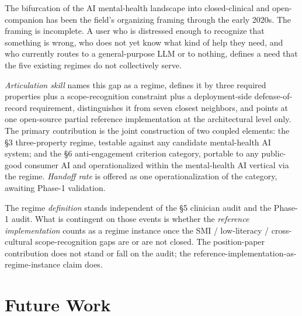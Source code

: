 \documentclass[letterpaper]{article}
\begin{document}
The bifurcation of the AI mental-health landscape into closed-clinical and open-companion has been the field's organizing framing through the early 2020s. The framing is incomplete. A user who is distressed enough to recognize that something is wrong, who does not yet know what kind of help they need, and who currently routes to a general-purpose LLM or to nothing, defines a need that the five existing regimes do not collectively serve.

\emph{Articulation skill} names this gap as a regime, defines it by three required properties plus a scope-recognition constraint plus a deployment-side defense-of-record requirement, distinguishes it from seven closest neighbors, and points at one open-source partial reference implementation at the architectural level only. The primary contribution is the joint construction of two coupled elements: the \S3 three-property regime, testable against any candidate mental-health AI system; and the \S6 anti-engagement criterion category, portable to any public-good consumer AI and operationalized within the mental-health AI vertical via the regime. \emph{Handoff rate} is offered as one operationalization of the category, awaiting Phase-1 validation.

The regime \emph{definition} stands independent of the \S5 clinician audit and the Phase-1 audit. What is contingent on those events is whether the \emph{reference implementation} counts as a regime instance once the SMI / low-literacy / cross-cultural scope-recognition gaps are or are not closed. The position-paper contribution does not stand or fall on the audit; the reference-implementation-as-regime-instance claim does.

\section{Future Work}
\end{document}
